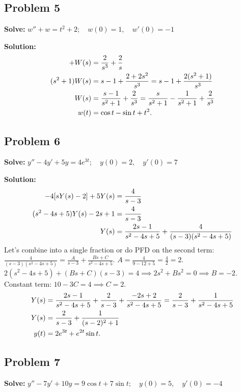 \documentclass[11pt, letterpaper]{article}
\theoremstyle{definition}
\theoremstyle{remark}
\begin{document}
\subsection*{Problem 5}
\textbf{Solve:} $w'' + w = t^2 + 2 ; \quad w(0) = 1 , \quad w'(0) = -1$

\textbf{Solution:}
\begin{align*}
[s^2 W(s) - s + 1] + W(s) &= \frac{2}{s^3} + \frac{2}{s} \\ \relax
(s^2 + 1)W(s) &= s - 1 + \frac{2 + 2s^2}{s^3} = s - 1 + \frac{2(s^2 + 1)}{s^3} \\ \relax
W(s) &= \frac{s - 1}{s^2 + 1} + \frac{2}{s^3} = \frac{s}{s^2 + 1} - \frac{1}{s^2 + 1} + \frac{2}{s^3} \\ \relax
w(t) &= \cos t - \sin t + t^2.
\end{align*}

\subsection*{Problem 6}
\textbf{Solve:} $y'' - 4y' + 5y = 4e^{3t} ; \quad y(0) = 2 , \quad y'(0) = 7$

\textbf{Solution:}
\begin{align*}
[s^2 Y(s) - 2s - 7] - 4[s Y(s) - 2] + 5Y(s) &= \frac{4}{s - 3} \\ \relax
(s^2 - 4s + 5)Y(s) - 2s + 1 &= \frac{4}{s - 3} \\ \relax
Y(s) &= \frac{2s - 1}{s^2 - 4s + 5} + \frac{4}{(s - 3)(s^2 - 4s + 5)}
\end{align*}
Let's combine into a single fraction or do PFD on the second term:
$\frac{4}{(s - 3)(s^2 - 4s + 5)} = \frac{A}{s - 3} + \frac{Bs + C}{s^2 - 4s + 5}$.
$A = \frac{4}{9 - 12 + 5} = \frac{4}{2} = 2$.
$2(s^2 - 4s + 5) + (Bs + C)(s - 3) = 4 \implies 2s^2 + Bs^2 = 0 \implies B = -2$.
Constant term: $10 - 3C = 4 \implies C = 2$.
\begin{align*}
Y(s) &= \frac{2s - 1}{s^2 - 4s + 5} + \frac{2}{s - 3} + \frac{-2s + 2}{s^2 - 4s + 5} = \frac{2}{s - 3} + \frac{1}{s^2 - 4s + 5} \\ \relax
Y(s) &= \frac{2}{s - 3} + \frac{1}{(s - 2)^2 + 1} \\ \relax
y(t) &= 2e^{3t} + e^{2t} \sin t.
\end{align*}

\subsection*{Problem 7}
\textbf{Solve:} $y'' - 7y' + 10y = 9 \cos t + 7 \sin t ; \quad y(0) = 5 , \quad y'(0) = -4$
\end{document}
